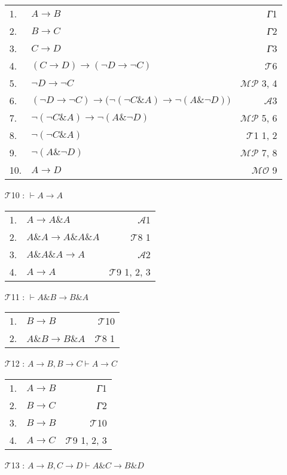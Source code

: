 \documentclass{article}
\begin{document}
\begin{itemize}
\begin{tabular}{llr}
1. & $A\rightarrow B$ & \textit{Г}1\\
2. & $B\rightarrow C$ & \textit{Г}2\\
3. & $C\rightarrow D$ & \textit{Г}3\\
4. & $\left(C\rightarrow D\right)\rightarrow\left(\neg D\rightarrow\neg C\right)$ & $\mathcal{T}$6\\
5. & $\neg D\rightarrow\neg C$ & $\mathcal{MP}$ 3, 4\\
6. & $\left(\neg D\rightarrow\neg C\right)\rightarrow\bigl(\neg\left(\neg C\& A\right)\rightarrow\neg\left(A\&\neg D\right)\bigr)$ & $\mathcal{A}$3\\
7. & $\neg\left(\neg C\& A\right)\rightarrow\neg\left(A\&\neg D\right)$ & $\mathcal{MP}$ 5, 6\\
8. & $\neg\left(\neg C\& A\right)$ & $\mathcal{T}$1 1, 2\\
9. & $\neg\left(A\&\neg D\right)$ & $\mathcal{MP}$ 7, 8\\
10. & $A\rightarrow D$ &$\mathcal{MO}$ 9
\end{tabular}
\item[$\mathcal{T}$10]: $\vdash A\rightarrow A$

\begin{tabular}{llr}
1. & $A\rightarrow A\& A$ & $\mathcal{A}$1\\
2. & $A\& A\rightarrow A\& A\& A$ & $\mathcal{T}$8 1\\
3. & $A\& A\& A\rightarrow A$ & $\mathcal{A}$2\\
4. & $A\rightarrow A$ & $\mathcal{T}$9 1, 2, 3
\end{tabular}
\item[$\mathcal{T}$11]: $\vdash A\& B\rightarrow B\& A$

\begin{tabular}{llr}
1. & $B\rightarrow B$ & $\mathcal{T}$10\\
2. & $A\& B\rightarrow B\& A$ & $\mathcal{T}$8 1
\end{tabular}
\item[$\mathcal{T}$12]: $A\rightarrow B,B\rightarrow C\vdash A\rightarrow C$

\begin{tabular}{llr}
1. & $A\rightarrow B$ & \textit{Г}1\\
2. & $B\rightarrow C$ & \textit{Г}2\\
3. & $B\rightarrow B$ & $\mathcal{T}$10\\
4. & $A\rightarrow C$ & $\mathcal{T}$9 1, 2, 3
\end{tabular}
\item[$\mathcal{T}$13]: $A\rightarrow B,C\rightarrow D\vdash A\& C\rightarrow B\& D$


\end{itemize}
\end{document}
